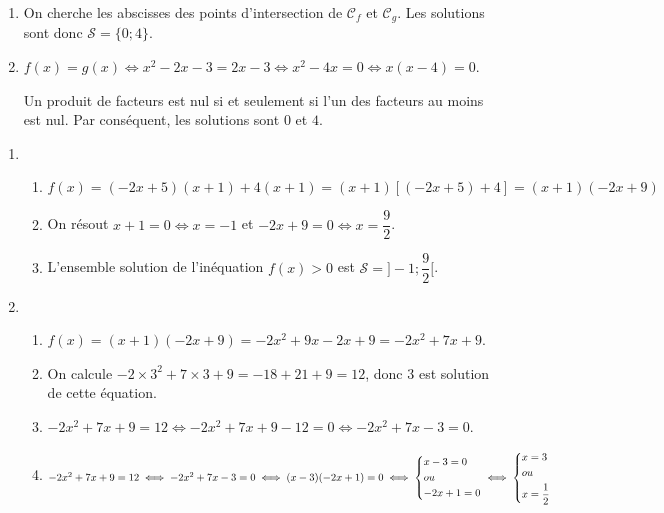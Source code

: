 \documentclass[a4paper]{article}
\begin{document}
\begin{exercice}{}{}
\begin{enumerate}
\item On cherche les abscisses des points d'intersection de $\mathcal{C}_f
$ et $\mathcal{C}_g$.
  Les solutions sont donc $\mathcal{S}=\{0;4\}$.

\item $f(x)=g(x) \iff x^2-2x-3=2x-3 \iff x^2-4x=0 \iff x(x-4)=0$.

Un produit de facteurs est nul si et seulement si l'un des facteurs au moins est nul.
Par conséquent, les solutions sont $0$ et $4$.

\end{enumerate}
        
    \end{exercice}
    

    \begin{exercice}{}{}
      \begin{enumerate}
        \item \begin{enumerate}
          \item $f(x)=(-2x+5)(x+1)+4(x+1)=(x+1)\left[ (-2x+5) + 4 \right]=(x+1)(-2x+9)$
          \item On résout $x+1=0 \iff x=-1$ et $-2x+9=0 \iff x=\dfrac{9}{2}$.
          \begin{center}
          \end{center}
          \item L'ensemble solution de l'inéquation $f(x)>0$ est $\mathcal{S}=]-1;\dfrac{9}{2}[$.
        \end{enumerate}
        \item \begin{enumerate}
          \item $f(x)=(x+1)(-2x+9)=-2x^2+9x-2x+9=-2x^2+7x+9$.
          \item On calcule $-2\times 3^2+7\times 3+9=-18+21+9=12$, donc $3$ est solution de cette équation.
          \item $-2x^2+7x+9=12 \iff -2x^2+7x+9-12=0 \iff -2x^2+7x-3=0$.
          \item $-2x^2+7x+9=12 \iff -2x^2+7x-3=0 \iff (x-3)(-2x+1)=0
          \iff
          \begin{dcases}
            x-3=0\\
            ou\\
            -2x+1=0\\
        \end{dcases}
        \iff
        \begin{dcases}
          x=3\\
          ou\\
          x=\dfrac{1}{2}\\
      \end{dcases}$


\end{enumerate}
\end{enumerate}
\end{exercice}
\end{document}
